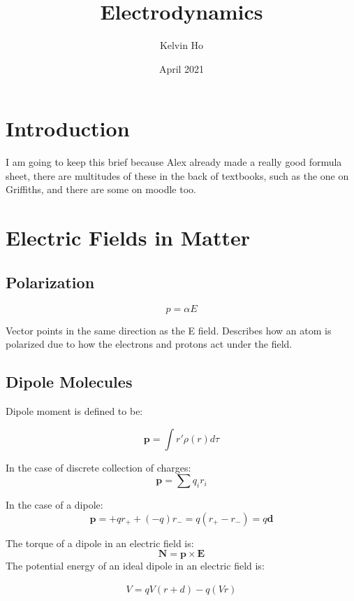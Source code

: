 \documentclass[12pt]{article}
\title{Electrodynamics}
\author{Kelvin Ho}
\date{April 2021}
\begin{document}
\maketitle

\section{Introduction}
I am going to keep this brief because Alex already made a really good formula sheet, there are multitudes of these in the back of textbooks, such as the one on Griffiths, and there are some on moodle too. 



\section{Electric Fields in Matter}

\subsection{Polarization}

\[ p = \alpha E\]

Vector points in the same direction as the E field. Describes how an atom is polarized due to how the electrons and protons act under the field.

\subsection{Dipole Molecules}


Dipole moment is defined to be:

\[\mathbf{p}= \int r' \rho(r) d\tau\]

In the case of discrete collection of charges:
\[ \mathbf{p} = \sum q_i r_i \]

In the case of a dipole:
\[ \mathbf{p} = +q r_+ + (-q)r_- = q(r_+-r_-) = q\mathbf{d}\]

The torque of a dipole in an electric field is:
\[ \mathbf{N} = \mathbf{p} \times \mathbf{E}\]
The potential energy of an ideal dipole in an electric field is:

\begin{align*}
    V = qV(r+d) - q(Vr)
\end{align*}
\end{document}
